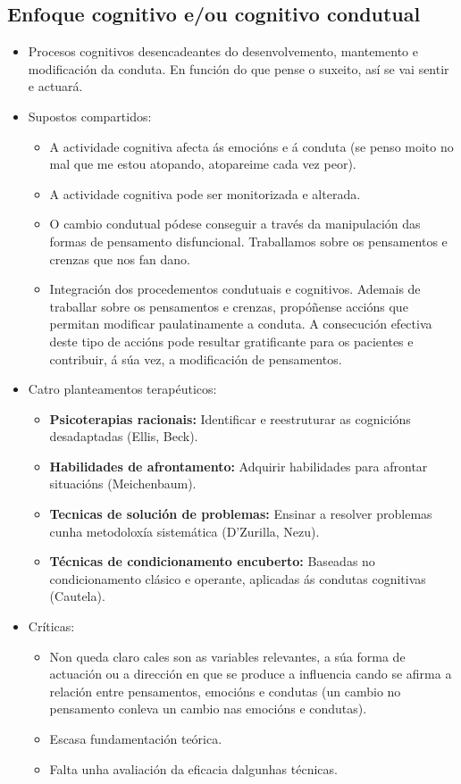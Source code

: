 \documentclass[a4paper,11pt]{article}
\begin{document}
\subsection{Enfoque cognitivo e/ou cognitivo condutual}
\begin{itemize}
	\item Procesos cognitivos desencadeantes do desenvolvemento, mantemento e modificación da 
	conduta. En función do que pense o suxeito, así se vai sentir e actuará.
	\item Supostos compartidos:
	\begin{itemize}
		\item A actividade cognitiva afecta ás emocións e á conduta (se penso moito no mal que me 
		estou atopando, atopareime cada vez peor).
		\item A actividade cognitiva pode ser monitorizada e alterada.
		\item O cambio condutual pódese conseguir a través da manipulación das formas de pensamento 
		disfuncional. Traballamos sobre os pensamentos e crenzas que nos fan dano.
		\item Integración dos procedementos condutuais e cognitivos. Ademais de traballar sobre os 
		pensamentos e crenzas, propóñense accións que permitan modificar paulatinamente a conduta. A 
		consecución efectiva deste tipo de accións pode resultar gratificante para os pacientes e 
		contribuir, á súa vez, a modificación de pensamentos.
	\end{itemize}
	\item Catro planteamentos terapéuticos:
	\begin{itemize}
		\item \textbf{Psicoterapias racionais:} Identificar e reestruturar as cognicións 
		desadaptadas (Ellis, Beck).
		\item \textbf{Habilidades de afrontamento:} Adquirir habilidades para afrontar situacións 
		(Meichenbaum).
		\item \textbf{Tecnicas de solución de problemas:} Ensinar a resolver problemas cunha 
		metodoloxía sistemática (D'Zurilla, Nezu).
		\item \textbf{Técnicas de condicionamento encuberto:} Baseadas no condicionamento clásico e 
		operante, aplicadas ás condutas cognitivas (Cautela).
	\end{itemize}
	\item Críticas:
	\begin{itemize}
		\item Non queda claro cales son as variables relevantes, a súa forma de actuación ou a 
		dirección en que se produce a influencia cando se afirma a relación entre pensamentos, 
		emocións e condutas (un cambio no pensamento conleva un cambio nas emocións e condutas).
		\item Escasa fundamentación teórica.
		\item Falta unha avaliación da eficacia dalgunhas técnicas. 
	\end{itemize}
\end{itemize}
\end{document}
